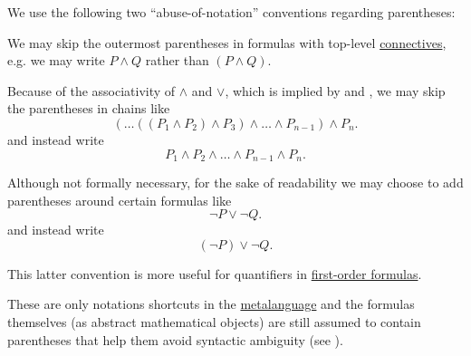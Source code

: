 \begin{remark}\label{rem:propositional_formula_parentheses}
  We use the following two \enquote{abuse-of-notation} conventions regarding parentheses:
  \begin{thmenum}
     We may skip the outermost parentheses in formulas with top-level \hyperref[def:propositional_language/connectives]{connectives}, e.g. we may write \( P \wedge Q \) rather than \( (P \wedge Q) \).

     Because of the associativity of \( \wedge \) and \( \vee \), which is implied by  and , we may skip the parentheses in chains like
    \begin{equation*}
      ( \ldots ((P_1 \wedge P_2) \wedge P_3) \wedge \ldots \wedge P_{n-1} ) \wedge P_n.
    \end{equation*}
    and instead write
    \begin{equation*}
      P_1 \wedge P_2 \wedge \ldots \wedge P_{n-1} \wedge P_n.
    \end{equation*}

     Although not formally necessary, for the sake of readability we may choose to add parentheses around certain formulas like
    \begin{equation*}
      \neg P \vee \neg Q.
    \end{equation*}
    and instead write
    \begin{equation*}
      (\neg P) \vee \neg Q.
    \end{equation*}

    This latter convention is more useful for quantifiers in \hyperref[def:first_order_syntax/formula]{first-order formulas}.
  \end{thmenum}

  These are only notations shortcuts in the \hyperref[rem:metalogic]{metalanguage} and the formulas themselves (as abstract mathematical objects) are still assumed to contain parentheses that help them avoid syntactic ambiguity (see ).
\end{remark}

